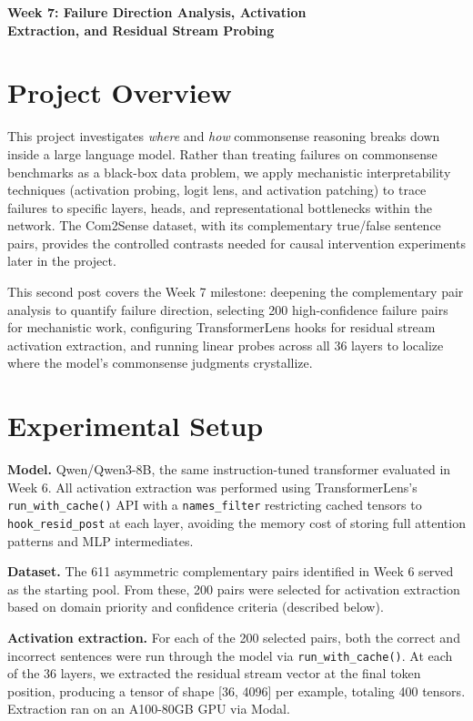 \documentclass[11pt]{article}
\begin{document}
\begin{center}
{\LARGE \textbf{Week 7: Failure Direction Analysis, Activation\\Extraction, and Residual Stream Probing}}
\end{center}

\section*{Project Overview}

This project investigates \textit{where} and \textit{how} commonsense reasoning breaks down inside a large language model. Rather than treating failures on commonsense benchmarks as a black-box data problem, we apply mechanistic interpretability techniques (activation probing, logit lens, and activation patching) to trace failures to specific layers, heads, and representational bottlenecks within the network. The Com2Sense dataset, with its complementary true/false sentence pairs, provides the controlled contrasts needed for causal intervention experiments later in the project.

This second post covers the Week 7 milestone: deepening the complementary pair analysis to quantify failure direction, selecting 200 high-confidence failure pairs for mechanistic work, configuring TransformerLens hooks for residual stream activation extraction, and running linear probes across all 36 layers to localize where the model's commonsense judgments crystallize.

\section*{Experimental Setup}

\textbf{Model.} Qwen/Qwen3-8B, the same instruction-tuned transformer evaluated in Week 6. All activation extraction was performed using TransformerLens's \texttt{run\_with\_cache()} API with a \texttt{names\_filter} restricting cached tensors to \texttt{hook\_resid\_post} at each layer, avoiding the memory cost of storing full attention patterns and MLP intermediates.

\textbf{Dataset.} The 611 asymmetric complementary pairs identified in Week 6 served as the starting pool. From these, 200 pairs were selected for activation extraction based on domain priority and confidence criteria (described below).

\textbf{Activation extraction.} For each of the 200 selected pairs, both the correct and incorrect sentences were run through the model via \texttt{run\_with\_cache()}. At each of the 36 layers, we extracted the residual stream vector at the final token position, producing a tensor of shape [36, 4096] per example, totaling 400 tensors. Extraction ran on an A100-80GB GPU via Modal.
\end{document}
